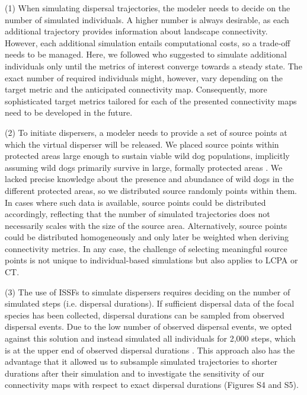 \documentclass[abstract=on,10pt,a4paper,bibliography=totocnumbered]{article}
\begin{document}
(1) When simulating dispersal trajectories, the modeler needs to decide on the
number of simulated individuals. A higher number is always desirable, as each
additional trajectory provides information about landscape connectivity.
However, each additional simulation entails computational costs, so a trade-off
needs to be managed. Here, we followed \cite{Signer.2017} who suggested to
simulate additional individuals only until the metrics of interest converge
towards a steady state. The exact number of required individuals might, however,
vary depending on the target metric and the anticipated connectivity map.
Consequently, more sophisticated target metrics tailored for each of the
presented connectivity maps need to be developed in the future.

(2) To initiate dispersers, a modeler needs to provide a set of source points at
which the virtual disperser will be released. We placed source points within
protected areas large enough to sustain viable wild dog populations, implicitly
assuming wild dogs primarily survive in large, formally protected areas
\citep{Woodroffe.1999, DaviesMostert.2012, Woodroffe.2012, VanDerMeer.2014}. We
lacked precise knowledge about the presence and abundance of wild dogs in the
different protected areas, so we distributed source randomly points within them.
In cases where such data is available, source points could be distributed
accordingly, reflecting that the number of simulated trajectories does not
necessarily scales with the size of the source area. Alternatively, source
points could be distributed homogeneously and only later be weighted when
deriving connectivity metrics. In any case, the challenge of selecting
meaningful source points is not unique to individual-based simulations but also
applies to LCPA or CT.

(3) The use of ISSFs to simulate dispersers requires deciding on the number of
simulated steps (i.e. dispersal durations). If sufficient dispersal data of the
focal species has been collected, dispersal durations can be sampled from
observed dispersal events. Due to the low number of observed dispersal events,
we opted against this solution and instead simulated all individuals for 2,000
steps, which is at the upper end of observed dispersal durations
\citep{DaviesMostert.2012, Masenga.2016, Cozzi.2020, Hofmann.2021}. This
approach also has the advantage that it allowed us to subsample simulated
trajectories to shorter durations after their simulation and to investigate the
sensitivity of our connectivity maps with respect to exact dispersal durations
(Figures S4 and S5).
\end{document}
